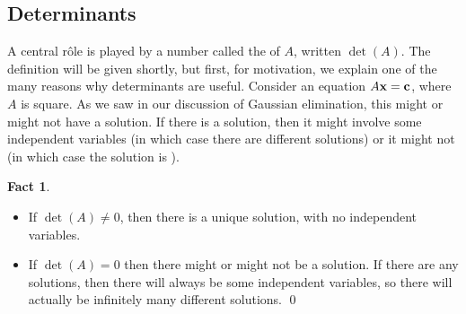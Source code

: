 \documentclass[a4paper]{book}
\theoremstyle{definition}
\newtheorem{fact}[theorem]{Fact}
\begin{document}
\subsection{Determinants}

A central r\^ole is played by a number called the 
of $A$, written $\det(A)$.  The definition will be given shortly, but
first, for motivation, we explain one of the many reasons why
determinants are useful.  Consider an equation $A\mathbf{x}=\mathbf{c}$,
where $A$ is square.  As we saw in our discussion of Gaussian
elimination, this might or might not have a solution.  If there is a
solution, then it might involve some independent variables (in which
case there are  different solutions) or it might
not (in which case the solution is ).
\begin{fact}
 \begin{itemize}
  \item If $\det(A)\neq 0$, then there is a unique solution, with no
   independent variables.
  \item If $\det(A)=0$ then there might or might not be a solution.
   If there are any solutions, then there will always be some
   independent variables, so there will actually be infinitely many
   different solutions. \qed
 \end{itemize}
\end{fact}
\end{document}
